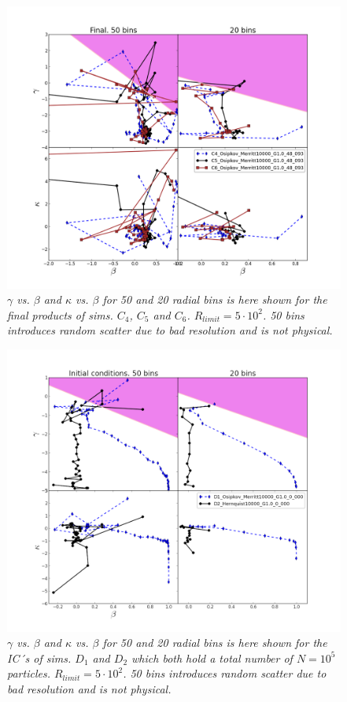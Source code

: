 \begin{figure}[h!]
	\centering
		\includegraphics[width=1.0\linewidth]{img/C4C5C6_beta_gamma_kappa_Final.png}
		{\medskip\caption{\textsl{$\gamma$ vs. $\beta$ and $\kappa$ vs. $\beta$ for 50 and 20 radial bins is here shown for the final products of sims. $C_4$, $C_5$ and $C_6$. $R_{limit} = 5 \cdot 10^2$. 50 bins introduces random scatter due to bad resolution and is not physical.
\label{fig:Rv}}}}
\end{figure} 

\begin{figure}[h!]
	\centering
		\includegraphics[width=1.0\linewidth]{img/D1D2_beta_gamma_kappa.png}
		{\medskip\caption{\textsl{$\gamma$ vs. $\beta$ and $\kappa$ vs. $\beta$ for 50 and 20 radial bins is here shown for the IC´s of sims. $D_1$ and $D_2$ which both hold a total number of $N = 10^5$ particles. $R_{limit} = 5 \cdot 10^2$. 50 bins introduces random scatter due to bad resolution and is not physical.
\label{fig:Rv}}}}
\end{figure} 

